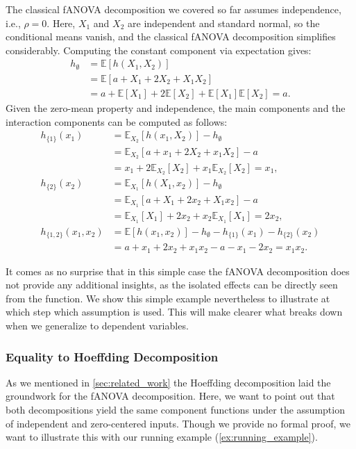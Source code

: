 The classical fANOVA decomposition we covered so far assumes independence, i.e., $\rho = 0$. 
Here, $X_1$ and $X_2$ are independent and standard normal, so the conditional means vanish, and the classical fANOVA decomposition simplifies considerably. 
Computing the constant component via expectation gives:
\begin{align*}
    h_{\emptyset} &= \mathbb{E}[h(X_1, X_2)] \\
    &= \mathbb{E}[a + X_1 + 2X_2 + X_1X_2] \\
    &= a + \mathbb{E}[X_1] + 2\mathbb{E}[X_2] + \mathbb{E}[X_1]\mathbb{E}[X_2] = a.
\end{align*}
Given the zero-mean property and independence, the main components and the interaction components can be computed as follows:
\begin{align*}
h_{\{1\}}(x_1) &= \mathbb{E}_{X_2}[h(x_1, X_2)] - h_{\emptyset} \\
&= \mathbb{E}_{X_2}[a + x_1 + 2X_2 + x_1X_2] - a \\
&= x_1 + 2\mathbb{E}_{X_2}[X_2] + x_1\mathbb{E}_{X_2}[X_2] = x_1,\\
h_{\{2\}}(x_2) &= \mathbb{E}_{X_1}[h(X_1, x_2)] - h_{\emptyset} \\
&= \mathbb{E}_{X_1}[a + X_1 + 2x_2 + X_1x_2] - a \\
&= \mathbb{E}_{X_1}[X_1] + 2x_2 + x_2\mathbb{E}_{X_1}[X_1] = 2x_2,\\
h_{\{1,2\}}(x_1, x_2) &= \mathbb{E}[h(x_1, x_2)] - h_{\emptyset} - h_{\{1\}}(x_1) - h_{\{2\}}(x_2) \\
&= a + x_1 + 2x_2 + x_1x_2 - a - x_1 - 2x_2 = x_1x_2.
\end{align*}

It comes as no surprise that in this simple case the fANOVA decomposition does not provide any additional insights, as the isolated effects can be directly seen from the function.
We show this simple example nevertheless to illustrate at which step which assumption is used.
This will make clearer what breaks down when we generalize to dependent variables.

\subsubsection{Equality to Hoeffding Decomposition}
As we mentioned in \autoref{sec:related_work} the Hoeffding decomposition \citep{hoeffding1948} laid the groundwork for the fANOVA decomposition.
Here, we want to point out that both decompositions yield the same component functions under the assumption of independent and zero-centered inputs. Though we provide no formal proof, we want to illustrate this with our running example (\autoref{ex:running_example}).

